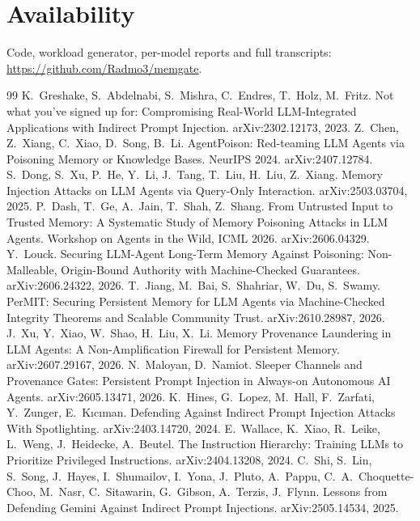 \documentclass[10pt]{article}
\begin{document}
\section*{Availability}

Code, workload generator, per-model reports and full transcripts:
\url{https://github.com/Radmo3/memgate}.

\begin{thebibliography}{99}\small
{} K.~Greshake, S.~Abdelnabi, S.~Mishra, C.~Endres, T.~Holz, M.~Fritz. Not what
you've signed up for: Compromising Real-World LLM-Integrated Applications with Indirect Prompt
Injection. arXiv:2302.12173, 2023.
 Z.~Chen, Z.~Xiang, C.~Xiao, D.~Song, B.~Li. AgentPoison: Red-teaming LLM
Agents via Poisoning Memory or Knowledge Bases. NeurIPS 2024. arXiv:2407.12784.
 S.~Dong, S.~Xu, P.~He, Y.~Li, J.~Tang, T.~Liu, H.~Liu, Z.~Xiang. Memory Injection
Attacks on LLM Agents via Query-Only Interaction. arXiv:2503.03704, 2025.
 P.~Dash, T.~Ge, A.~Jain, T.~Shah, Z.~Shang. From Untrusted Input to Trusted
Memory: A Systematic Study of Memory Poisoning Attacks in LLM Agents. Workshop on Agents in the
Wild, ICML 2026. arXiv:2606.04329.
 Y.~Louck. Securing LLM-Agent Long-Term Memory Against Poisoning: Non-Malleable,
Origin-Bound Authority with Machine-Checked Guarantees. arXiv:2606.24322, 2026.
 T.~Jiang, M.~Bai, S.~Shahriar, W.~Du, S.~Swamy. PerMIT: Securing Persistent Memory
for LLM Agents via Machine-Checked Integrity Theorems and Scalable Community Trust.
arXiv:2610.28987, 2026.
 J.~Xu, Y.~Xiao, W.~Shao, H.~Liu, X.~Li. Memory Provenance Laundering in LLM Agents:
A Non-Amplification Firewall for Persistent Memory. arXiv:2607.29167, 2026.
 N.~Maloyan, D.~Namiot. Sleeper Channels and Provenance Gates: Persistent
Prompt Injection in Always-on Autonomous AI Agents. arXiv:2605.13471, 2026.
 K.~Hines, G.~Lopez, M.~Hall, F.~Zarfati, Y.~Zunger, E.~K{\i}c{\i}man.
Defending Against Indirect Prompt Injection Attacks With Spotlighting. arXiv:2403.14720, 2024.
 E.~Wallace, K.~Xiao, R.~Leike, L.~Weng, J.~Heidecke, A.~Beutel. The
Instruction Hierarchy: Training LLMs to Prioritize Privileged Instructions. arXiv:2404.13208, 2024.
 C.~Shi, S.~Lin, S.~Song, J.~Hayes, I.~Shumailov, I.~Yona, J.~Pluto,
A.~Pappu, C.~A.~Choquette-Choo, M.~Nasr, C.~Sitawarin, G.~Gibson, A.~Terzis, J.~Flynn. Lessons
from Defending Gemini Against Indirect Prompt Injections. arXiv:2505.14534, 2025.

\end{thebibliography}
\end{document}
